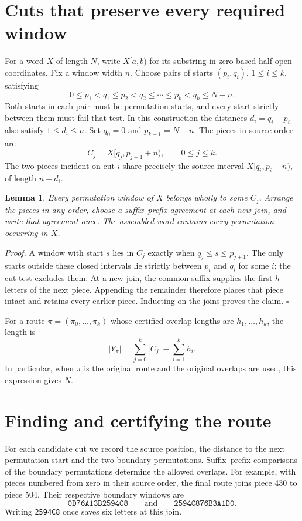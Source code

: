 \documentclass[11pt]{article}
\newtheorem{lemma}[theorem]{Lemma}
\newcommand{\proofstart}{\par\noindent\textit{Proof.}\quad}
\newcommand{\proofend}{\unskip\nobreak\hfill\(\square\)\par}
\begin{document}
\section{Cuts that preserve every required window}
For a word \(X\) of length \(N\), write \(X[a,b)\) for its substring in zero-based half-open coordinates. Fix a window width \(n\). Choose pairs of starts \((p_i,q_i)\), \(1\leq i\leq k\), satisfying
\[
0\le p_1<q_1\le p_2<q_2\le\cdots\le p_k<q_k\le N-n .
\]
Both starts in each pair must be permutation starts, and every start strictly between them must fail that test. In this construction the distances \(d_i=q_i-p_i\) also satisfy \(1\leq d_i\leq n\). Set \(q_0=0\) and \(p_{k+1}=N-n\). The pieces in source order are
\[
 C_j=X[q_j,p_{j+1}+n),\qquad 0\leq j\leq k .
\]
The two pieces incident on cut \(i\) share precisely the source interval \(X[q_i,p_i+n)\), of length \(n-d_i\).

\begin{lemma}\label{lem:pieces}
Every permutation window of \(X\) belongs wholly to some \(C_j\). Arrange the pieces in any order, choose a suffix--prefix agreement at each new join, and write that agreement once. The assembled word contains every permutation occurring in \(X\).
\end{lemma}
\proofstart
A window with start \(s\) lies in \(C_j\) exactly when \(q_j\le s\le p_{j+1}\). The only starts outside these closed intervals lie strictly between \(p_i\) and \(q_i\) for some \(i\); the cut test excludes them. At a new join, the common suffix supplies the first \(h\) letters of the next piece. Appending the remainder therefore places that piece intact and retains every earlier piece. Inducting on the joins proves the claim.
\proofend

For a route \(\pi=(\pi_0,\ldots,\pi_k)\) whose certified overlap lengths are \(h_1,\ldots,h_k\), the length is
\[
 |Y_\pi|=\sum_{j=0}^{k}|C_j|-\sum_{i=1}^{k}h_i .
\]
In particular, when \(\pi\) is the original route and the original overlaps are used, this expression gives \(N\).

\section{Finding and certifying the route}
For each candidate cut we record the source position, the distance to the next permutation start and the two boundary permutations. Suffix--prefix comparisons of the boundary permutations determine the allowed overlaps. For example, with pieces numbered from zero in their source order, the final route joins piece 430 to piece 504. Their respective boundary windows are
\[
 \texttt{0D76A13B2594C8}\qquad\text{and}\qquad
 \texttt{2594C876B3A1D0}.
\]
Writing \texttt{2594C8} once saves six letters at this join.
\end{document}
